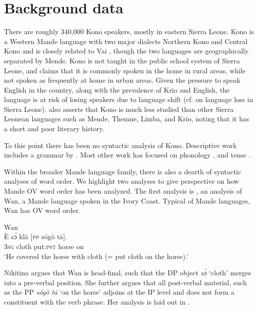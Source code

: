 \documentclass[output=paper,colorlinks,citecolor=brown,draftmode
]{langscibook}
\begin{document}
\section{Background data}
\label{sec:Background Data}
There are roughly 340,000 Kono speakers, mostly in eastern Sierra Leone. Kono is a Western Mande language with two major dialects \textendash{} Northern Kono and Central Kono \citep{EthnologueSmith}  \textendash{} and is closely related to Vai \citep{kaiser2011grammar}, though the two languages are geographically separated by Mende. Kono is not taught in the public school system of Sierra Leone, and \citet{kaiser2011grammar} claims that it is commonly spoken in the home in rural areas, while not spoken as frequently at home in urban areas. Given the pressure to speak English in the country, along with the prevalence of Krio and English, the language is at risk of losing speakers due to language shift (cf. \citealt{kanu6languages, gellman2020mother} on language loss in Sierra Leone). \citet{manyeh1983aspects} also asserts that Kono is much less studied than other Sierra Leonean languages such as Mende, Themne, Limba, and Krio, noting that it has a short and poor literary history. 

To this point there has been no syntactic analysis of Kono. Descriptive work includes a grammar by \citet{kaiser2011grammar}. Most other work has focused on phonology \citep{manyeh1983aspects, foday1985phonetics}, and tense \citep{ jimissatense}. 

Within the broader Mande language family, there is also a dearth of syntactic analyses of word order. We highlight two analyses to give perspective on how Mande OV word order has been analyzed. The first analysis is \citet{nikitina2019verb}, an analysis of Wan, a Mande language spoken in the Ivory Coast. Typical of Mande languages, Wan has OV word order. 

\ea \label{ex:Wan: OV}
Wan \citep[\#1]{nikitina2019verb} \\
\gll È sɔ́ klā [\textsc{pp} sógò tā]. \\
\textsc{3sg} cloth put:\textsc{pst} {} horse on \\
\glt `He covered the horse with cloth (= put cloth on the horse).'
\z

Nikitina argues that Wan is head-final, such that the DP object \textit{sɔ́} ‘cloth’ merges into a pre-verbal position. She further argues that all post-verbal material, such as the PP \textit{sógò tā} ‘on the horse’  adjoins at the IP level and does not form a constituent with the verb phrase.  Her analysis is laid out in . 
\end{document}
